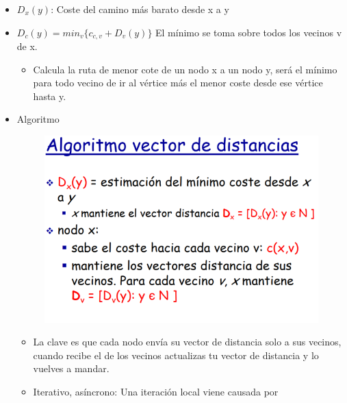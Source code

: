 \documentclass[12pt, twoside, openright]{report} %
\begin{document}
\begin{itemize}
	\item \(D_x(y)\): Coste del camino más barato desde x a y
	\item \(D_c(y)=min_v \{ c_{c,v}+D_v(y)\}\) El mínimo se toma sobre todos
	      los vecinos v de x.

	      \begin{itemize}
		      \item Calcula la ruta de menor cote de un nodo x a un nodo y, será el
		            mínimo para todo vecino de ir al vértice más el menor coste
		            desde ese vértice hasta y.
	      \end{itemize}
	\item Algoritmo
	      \begin{figure}[H]
		      {\includegraphics[scale=.35]{Untitled 42.png}}
	      \end{figure}
	      \begin{itemize}
		      \item La clave es que cada nodo envía su vector de distancia solo a sus
		            vecinos, cuando recibe el de los vecinos actualizas tu vector de
		            distancia y lo vuelves a mandar.
		      \item Iterativo, asíncrono: Una iteración local viene causada por


\end{itemize}
\end{itemize}
\end{document}
